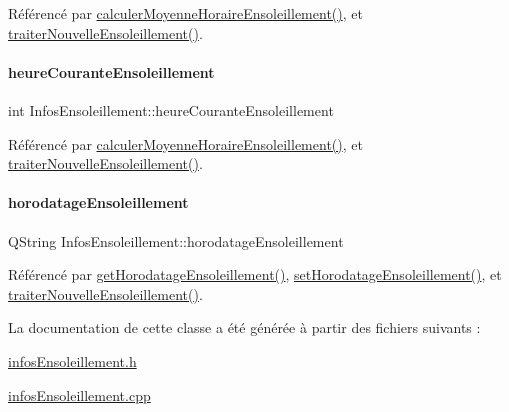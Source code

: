 Référencé par \hyperlink{class_infos_ensoleillement_a43d0967a59887bf70071296fef0660d3}{calculer\+Moyenne\+Horaire\+Ensoleillement()}, et \hyperlink{class_infos_ensoleillement_abe5426845614e3383e915dc9b3cacc3e}{traiter\+Nouvelle\+Ensoleillement()}.

\mbox{\label{class_infos_ensoleillement_adbf40d147f8a7dbcf5f71b1ac4e0933d}} 
\paragraph{\texorpdfstring{heure\+Courante\+Ensoleillement}{heureCouranteEnsoleillement}}
{\footnotesize\ttfamily int Infos\+Ensoleillement\+::heure\+Courante\+Ensoleillement\hspace{0.3cm}{\ttfamily [private]}}



Référencé par \hyperlink{class_infos_ensoleillement_a43d0967a59887bf70071296fef0660d3}{calculer\+Moyenne\+Horaire\+Ensoleillement()}, et \hyperlink{class_infos_ensoleillement_abe5426845614e3383e915dc9b3cacc3e}{traiter\+Nouvelle\+Ensoleillement()}.

\mbox{\label{class_infos_ensoleillement_aa2014f9d13e69e9807543737240dbfd3}} 
\paragraph{\texorpdfstring{horodatage\+Ensoleillement}{horodatageEnsoleillement}}
{\footnotesize\ttfamily Q\+String Infos\+Ensoleillement\+::horodatage\+Ensoleillement\hspace{0.3cm}{\ttfamily [private]}}



Référencé par \hyperlink{class_infos_ensoleillement_a0bd39540c8b4a242ea378c91bbc58b89}{get\+Horodatage\+Ensoleillement()}, \hyperlink{class_infos_ensoleillement_a35cd0359b8bcf5bd572cbef2195fa8d1}{set\+Horodatage\+Ensoleillement()}, et \hyperlink{class_infos_ensoleillement_abe5426845614e3383e915dc9b3cacc3e}{traiter\+Nouvelle\+Ensoleillement()}.



La documentation de cette classe a été générée à partir des fichiers suivants \+:\begin{DoxyCompactItemize}
\item 
\hyperlink{infos_ensoleillement_8h}{infos\+Ensoleillement.\+h}\item 
\hyperlink{infos_ensoleillement_8cpp}{infos\+Ensoleillement.\+cpp}\end{DoxyCompactItemize}
